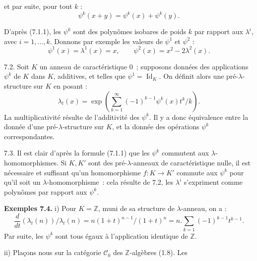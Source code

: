 
et par
suite, pour tout \(k\) :
\[
  \psi^k(x+y)=\psi^k(x)+\psi^k(y).
\]

D'après (7.1.1), les \(\psi^k\) sont des polynômes isobares de poids \(k\) par rapport aux \(\lambda^i\), avec \(i=1,\ldots,k\). Donnons par exemple les valeurs de \(\psi^1\) et \(\psi^2\) :
\[
  \psi^1(x)=\lambda^1(x)=x,
  \qquad
  \psi^2(x)=x^2-2\lambda^2(x).
\]

7.2. Soit \(K\) un anneau de caractéristique \(0\)~; supposons données des applications \(\psi^k\) de \(K\) dans \(K\), additives, et telles que \(\psi^1=\operatorname{Id}_K\). On définit alors une pré-\(\lambda\)-structure sur \(K\) en posant :
\begin{equation}\tag{7.2.1}
  \lambda_t(x)=
  \exp\left(\sum_{k=1}^{\infty}(-1)^{k-1}\psi^k(x)t^k/k\right).
\end{equation}
La multiplicativité résulte de l'additivité des \(\psi^k\). Il y a donc équivalence entre la donnée d'une pré-\(\lambda\)-structure sur \(K\), et la donnée des opérations \(\psi^k\) correspondantes.

7.3. Il est clair d'après la formule (7.1.1) que les \(\psi^k\) commutent aux \(\lambda\)-homomorphismes. Si \(K,K'\) sont des pré-\(\lambda\)-anneaux de caractéristique nulle, il est nécessaire et suffisant qu'un homomorphisme \(f:K\to K'\) commute aux \(\psi^k\) pour qu'il soit un \(\lambda\)-homomorphisme~: cela résulte de 7.2, les \(\lambda^i\) s'expriment comme polynômes par rapport aux \(\psi^k\).

\textbf{Exemples 7.4.} i) Pour \(K=\mathbb Z\), muni de sa structure de \(\lambda\)-anneau, on a :
\[
  \frac{d}{dt}(\lambda_t(n))/\lambda_t(n)
  =
  n(1+t)^{n-1}/(1+t)^n
  =
  n.\sum_{k=1}(-1)^{k-1}t^{k-1}.
\]
Par suite, les \(\psi^k\) sont tous égaux à l'application identique de \(\mathbb Z\).

ii) Plaçons nous sur la catégorie \(\mathcal C_0\) des \(\mathbb Z\)-algèbres (1.8). Les 

